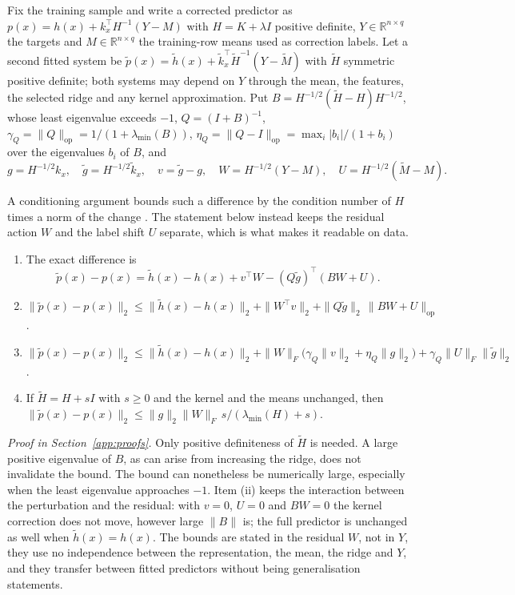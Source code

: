 Fix the training sample and write a corrected predictor as
$p(x)=h(x)+k_x^{\top}H^{-1}(Y-M)$ with $H=K+\lambda I$ positive definite, $Y\in\mathbb R^{n\times q}$ the targets
and $M\in\mathbb R^{n\times q}$ the training-row means used as correction labels. Let a second fitted system be
$\widetilde p(x)=\widetilde h(x)+\widetilde k_x^{\top}\widetilde H^{-1}(Y-\widetilde M)$ with $\widetilde H$
symmetric positive definite; both systems may depend on $Y$ through the mean, the features, the selected ridge and
any kernel approximation. Put $B=H^{-1/2}(\widetilde H-H)H^{-1/2}$, whose least eigenvalue exceeds $-1$,
$Q=(I+B)^{-1}$, $\gamma_Q=\|Q\|_{\mathrm{op}}=1/(1+\lambda_{\min}(B))$,
$\eta_Q=\|Q-I\|_{\mathrm{op}}=\max_i|b_i|/(1+b_i)$ over the eigenvalues $b_i$ of $B$, and
\[
g=H^{-1/2}k_x,\quad \widetilde g=H^{-1/2}\widetilde k_x,\quad v=\widetilde g-g,\quad
W=H^{-1/2}(Y-M),\quad U=H^{-1/2}(\widetilde M-M).
\]

A conditioning argument bounds such a difference by the condition number of $H$ times a norm of the
change \cite{stewartsun,golubvanloan,higham}. The statement below instead keeps the residual action
$W$ and the label shift $U$ separate, which is what makes it readable on data.

\begin{proposition}\label{prop:perturb}
\begin{enumerate}
\item The exact difference is
\[
\widetilde p(x)-p(x)=\widetilde h(x)-h(x)+v^{\top}W
                  -(Q\widetilde g)^{\top}(BW+U).
\]
\item $\|\widetilde p(x)-p(x)\|_2\le\|\widetilde h(x)-h(x)\|_2+\|W^{\top}v\|_2
+\|Q\widetilde g\|_2\,\|BW+U\|_{\mathrm{op}}$.
\item $\|\widetilde p(x)-p(x)\|_2\le\|\widetilde h(x)-h(x)\|_2
+\|W\|_F\bigl(\gamma_Q\|v\|_2+\eta_Q\|g\|_2\bigr)+\gamma_Q\|U\|_F\|\widetilde g\|_2$.
\item If $\widetilde H=H+sI$ with $s\ge0$ and the kernel and the means unchanged, then
$\|\widetilde p(x)-p(x)\|_2\le\|g\|_2\|W\|_F\,s/(\lambda_{\min}(H)+s)$.
\end{enumerate}
\end{proposition}

\noindent\emph{Proof in Section~\ref{app:proofs}.}
Only positive definiteness of $\widetilde H$ is needed. A large positive eigenvalue of $B$,
as can arise from increasing the ridge, does not invalidate the bound. The bound can
nonetheless be numerically large, especially when the least eigenvalue approaches $-1$. Item (ii) keeps the
interaction between the perturbation and the residual: with $v=0$, $U=0$ and $BW=0$ the kernel correction does not move, however large $\|B\|$ is; the full predictor is
unchanged as well when $\widetilde h(x)=h(x)$. The bounds are stated in the residual $W$, not in $Y$, they use no independence between
the representation, the mean, the ridge and $Y$, and they transfer between fitted predictors without being
generalisation statements.

